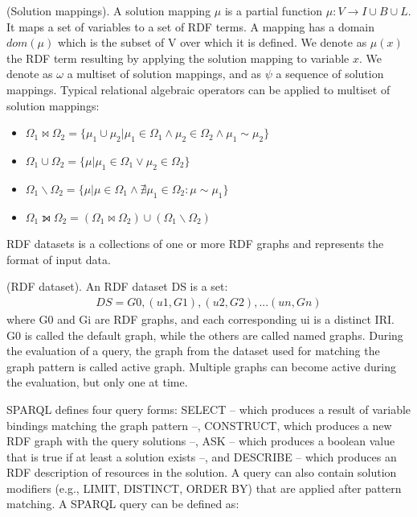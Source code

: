 \begin{Definition}
(Solution mappings). A solution mapping $\mu$ is a partial function $\mu \colon V \rightarrow I \cup B \cup L$. It maps a set of variables to a set of RDF terms. 
A mapping has a domain $dom(\mu)$ which is the subset of V over which it is defined. We denote as $\mu(x)$ the RDF term resulting by applying the solution mapping to variable $x$. We denote as $\omega$ a multiset of solution mappings, and as $\psi$ a sequence of solution mappings. 
Typical relational algebraic operators can be applied to multiset of solution mappings:
\begin{itemize}[label={}, nosep]
\item $\Omega_1\Join\Omega_2 = \{\mu_1 \cup \mu_2 | \mu_1 \in \Omega_1 \wedge \mu_2 \in \Omega_2 \wedge \mu_1 \sim \mu_2\}$
\item $\Omega_1 \cup \Omega_2 = \{\mu| \mu_1 \in \Omega_1 \vee \mu_2 \in \Omega_2\}$
\item $\Omega_1 \backslash \Omega_2 = \{\mu| \mu \in \Omega_1 \wedge \nexists \mu_1 \in \Omega_2 \colon \mu \sim \mu_1\}$
\item $\Omega_1\leftouterjoin\Omega_2 = (\Omega_1\Join\Omega_2) \cup (\Omega_1 \backslash \Omega_2)$
\end{itemize}  
\end{Definition}

RDF datasets is a collections of one or more RDF graphs and represents the format of input data.
\begin{Definition}
(RDF dataset). An RDF dataset DS is a set: 
\noindent\begin{align*}
DS = {G0, (u1, G1), (u2, G2), ...(un, Gn)}
\end{align*}
where G0 and Gi are RDF graphs, and each corresponding ui is a distinct IRI. G0 is called the default graph, while the others are called named graphs. During the evaluation of a query, the graph from the dataset used for matching the graph pattern is called active graph. Multiple graphs can become active during the evaluation, but only one at time.
\end{Definition}

SPARQL defines four query forms: SELECT -- which produces a result of variable bindings matching the graph pattern --, CONSTRUCT, which produces a new RDF graph with the query solutions --, ASK -- which produces a boolean value that is true if at least a solution exists --, and DESCRIBE -- which produces an RDF description of resources in the solution.
A query can also contain solution modifiers (e.g., LIMIT, DISTINCT, ORDER BY) that are applied after pattern matching.
A SPARQL query \cite{DBLP:journals/tods/PerezAG09} can be defined as:

